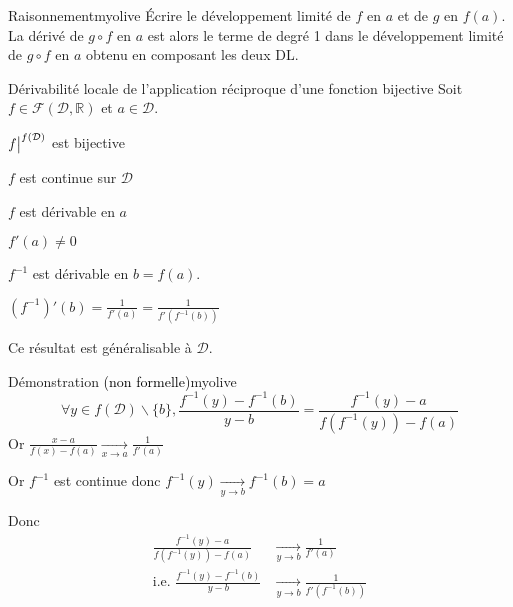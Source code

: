     \begin{demo}{Raisonnement}{myolive}
        Écrire le développement limité de $f$ en $a$ et de $g$ en $f(a)$. La dérivé de $g \circ f$ en $a$ est alors le terme de degré 1 dans le développement limité de $g \circ f$ en $a$ obtenu en composant les deux DL.
    \end{demo}

    \begin{prop}{Dérivabilité locale de l’application réciproque d’une fonction bijective}{}
        Soit $f \in \mathcal{F}(\mathcal{D}, \mathbb{R})$ et $a \in \mathcal{D}$. 

        \begin{suppose}
            \item $\corestr{f}{f(\mathcal{D})}$ est bijective
            \item $f$ est continue sur $\mathcal{D}$
            \item $f$ est dérivable en $a$
            \item $f'(a) \neq 0$
        \end{suppose}
        \begin{alors}
            \item $f^{-1}$ est dérivable en $b = f(a)$.
            \item $\left(f^{-1}\right)'(b) = \frac{1}{f'(a)} = \frac{1}{f'(f^{-1}(b))}$
        \end{alors}
        Ce résultat est généralisable à $\mathcal{D}$.
    \end{prop}

    \begin{demo}{Démonstration \textcolor{black}{(non formelle)}}{myolive}
        \[ \forall y \in f(\mathcal{D}) \backslash \{ b \}, \frac{f^{-1}(y)- f^{-1}(b)}{y-b} = \frac{f^{-1}(y) -a}{f(f^{-1}(y))-f(a)} \]
        Or $\frac{x-a}{f(x)-f(a)} \underset{x \rightarrow a}{\longrightarrow} \frac{1}{f'(a)}$
        
        Or $f^{-1}$ est continue donc $f^{-1}(y) \underset{y \rightarrow b}{\longrightarrow} f^{-1}(b) = a$
        
        Donc \begin{align*}
            \frac{f^{-1}(y)-a}{f(f^{-1}(y))-f(a)} & \underset{y \rightarrow b}{\longrightarrow} \frac{1}{f'(a)} \\
            \text{i.e. } \frac{f^{-1}(y)-f^{-1}(b)}{y-b} & \underset{y \rightarrow b}{\longrightarrow} \frac{1}{f'(f^{-1}(b))}
        \end{align*}
    \end{demo}


